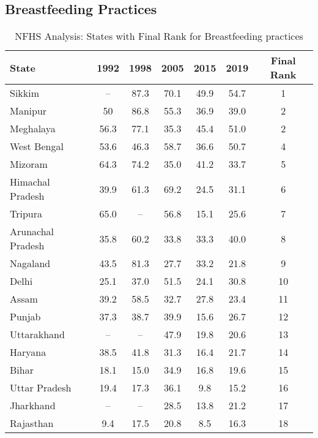 \subsection{Breastfeeding Practices}
\begin{table}[h!]
\centering
\begin{tabular}{lcccccc}
\toprule
\textbf{State} & \textbf{1992} & \textbf{1998} & \textbf{2005} & \textbf{2015} & \textbf{2019} & \textbf{Final Rank} \\
\midrule
Sikkim             & --   & 87.3  & 70.1  & 49.9  & 54.7  & 1  \\
Manipur           & 50   & 86.8  & 55.3  & 36.9  & 39.0  & 2  \\
Meghalaya         & 56.3 & 77.1  & 35.3  & 45.4  & 51.0  & 2  \\
West Bengal       & 53.6 & 46.3  & 58.7  & 36.6  & 50.7  & 4  \\
Mizoram           & 64.3 & 74.2  & 35.0  & 41.2  & 33.7  & 5  \\
Himachal Pradesh  & 39.9 & 61.3  & 69.2  & 24.5  & 31.1  & 6  \\
Tripura           & 65.0 & --    & 56.8  & 15.1  & 25.6  & 7  \\
Arunachal Pradesh & 35.8 & 60.2  & 33.8  & 33.3  & 40.0  & 8  \\
Nagaland          & 43.5 & 81.3  & 27.7  & 33.2  & 21.8  & 9  \\
Delhi             & 25.1 & 37.0  & 51.5  & 24.1  & 30.8  & 10 \\
Assam             & 39.2 & 58.5  & 32.7  & 27.8  & 23.4  & 11 \\
Punjab            & 37.3 & 38.7  & 39.9  & 15.6  & 26.7  & 12 \\
Uttarakhand       & --   & --    & 47.9  & 19.8  & 20.6  & 13 \\
Haryana           & 38.5 & 41.8  & 31.3  & 16.4  & 21.7  & 14 \\
Bihar             & 18.1 & 15.0  & 34.9  & 16.8  & 19.6  & 15 \\
Uttar Pradesh     & 19.4 & 17.3  & 36.1  & 9.8   & 15.2  & 16 \\
Jharkhand         & --   & --    & 28.5  & 13.8  & 21.2  & 17 \\
Rajasthan         & 9.4  & 17.5  & 20.8  & 8.5   & 16.3  & 18 \\
\bottomrule
\end{tabular}
\caption{NFHS Analysis: States with Final Rank for Breastfeeding practices}
\label{tab:breastmilk_rank}
\end{table}

